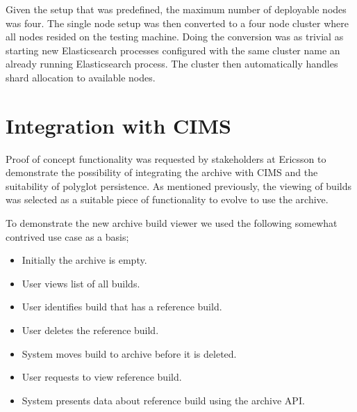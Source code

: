 Given the setup that was predefined, the maximum number of deployable nodes was four. The single node setup was then converted to a four node cluster where all nodes resided on the testing machine. Doing the conversion was as trivial as starting new Elasticsearch processes configured with the same cluster name an already running Elasticsearch process. The cluster then automatically handles shard allocation to available nodes.

%
%

\section{Integration with CIMS}
Proof of concept functionality was requested by stakeholders at Ericsson to demonstrate the possibility of integrating the archive with CIMS and the suitability of polyglot persistence. As mentioned previously, the viewing of builds was selected as a suitable piece of functionality to evolve to use the archive. 

To demonstrate the new archive build viewer we used the following somewhat contrived use case as a basis;
\begin{itemize}
\item Initially the archive is empty.
\item User views list of all builds.
\item User identifies build that has a reference build.
\item User deletes the reference build.
\item System moves build to archive before it is deleted.
\item User requests to view reference build.
\item System presents data about reference build using the archive API.
\end{itemize}

